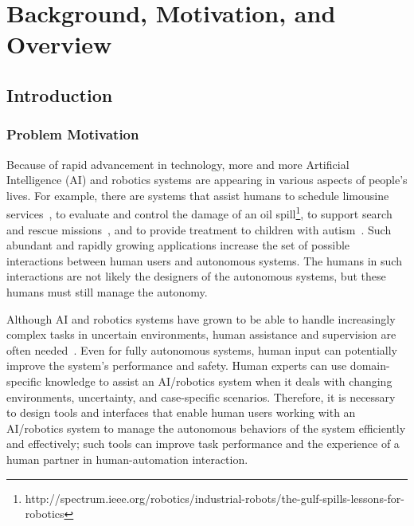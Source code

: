 \chapter{Background, Motivation, and Overview}
\label{chap:intro}

\section{Introduction}
\label{intro}

\subsection{Problem Motivation}
\label{motivation}

Because of rapid advancement in technology, more and more Artificial Intelligence (AI) and robotics systems are appearing in various aspects of people's lives. For example, there are systems that assist humans to schedule limousine services~\cite{Chun2010Limousine}, to evaluate and control the damage of an oil spill\footnote{http://spectrum.ieee.org/robotics/industrial-robots/the-gulf-spills-lessons-for-robotics}, to support search and rescue missions~\cite{Casper2003WTO, Lin2010Supporting}, and to provide treatment to children with autism~\cite{Robins2009From}. Such abundant and rapidly growing applications increase the set of possible interactions between human users and autonomous systems. The humans in such interactions are not likely the designers of the autonomous systems, but these humans must still manage the autonomy.

Although AI and robotics systems have grown to be able to handle increasingly complex tasks in uncertain environments, human assistance and supervision are often needed~\cite{Bainbridge1983Ironies}. Even for fully autonomous systems, human input can potentially improve the system's performance and safety. Human experts can use domain-specific knowledge to assist an AI/robotics system when it deals with changing environments, uncertainty, and case-specific scenarios. Therefore, it is necessary to design tools and interfaces that enable human users working with an AI/robotics system to manage the autonomous behaviors of the system efficiently and effectively; such tools can improve task performance and the experience of a human partner in human-automation interaction. 

